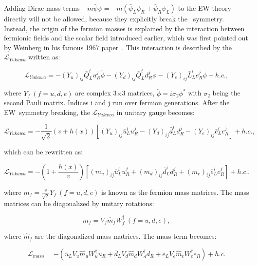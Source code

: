 Adding Dirac mass terms $-m\bar{\psi}\psi=-m(\bar{\psi}_{L}\psi_{R}+\bar{\psi}_{R}\psi_{L})$ to the \ac{EW} theory directly will not be allowed, because they explicitly break the \ew~symmetry. Instead, the origin of the fermion masses is explained by the interaction between fermionic fields and the scalar field introduced earlier, which was first pointed out by Weinberg in his famous 1967 paper~\cite{Weinberg:1967tq}. This interaction is described by the $\mathcal{L}_{Yukawa}$ written as:

\begin{equation}
\label{eq:Yukawa}
\mathcal{L}_{Yukawa}=-(Y_{u})_{ij}\bar{Q}_{L}^{i}u_{R}^{j}\tilde{\phi}-(Y_{d})_{ij}\bar{Q}_{L}^{i}d_{R}^{j}\phi-(Y_{e})_{ij}\bar{L}_{L}^{i}e_{R}^{j}\phi + h.c.,
\end{equation}

where $Y_{f}~(f=u,d,e)$ are complex 3$\times$3 matrices, $\tilde{\phi}=i\sigma_{2}\phi^{*}$ with $\sigma_{2}$ being the second Pauli matrix. Indices i and j run over fermion generations. After the \ac{EW}~symmetry breaking, the $\mathcal{L}_{Yukawa}$ in unitary gauge becomes:

\begin{equation}
\mathcal{L}_{Yukawa}=-\frac{1}{\sqrt{2}}(v+h(x))[(Y_{u})_{ij}\bar{u}_{L}^{i}u_{R}^{j}-(Y_{d})_{ij}\bar{d}_{L}^{i}d_{R}^{j}-(Y_{e})_{ij}\bar{e}_{L}^{i}e_{R}^{j}] + h.c.,
\end{equation}

which can be rewritten as:

\begin{equation}
\mathcal{L}_{Yukawa}=-(1+\frac{h(x)}{v})[(m_{u})_{ij}\bar{u}_{L}^{i}u_{R}^{j}+(m_{d})_{ij}\bar{d}_{L}^{i}d_{R}^{j}+(m_{e})_{ij}\bar{e}_{L}^{i}e_{R}^{j}] + h.c.,
\end{equation}

where $m_f=\frac{v}{\sqrt{2}}Y_{f}~(f=u,d,e)$ is known as the fermion mass matrices. The mass matrices can be diagonalized by unitary rotations:

\begin{equation}
m_{f}=V_{f}\hat{m}_{f}W^{\dagger}_{f}~(f=u,d,e),
\end{equation}

where $\hat{m}_{f}$ are the diagonalized mass matrices. The mass term becomes:

\begin{equation}
\mathcal{L}_{mass}=-(\bar{u}_{L}V_{u}\hat{m}_{u}W_{u}^{\dagger}u_{R}+\bar{d}_{L}V_{d}\hat{m}_{d}W^{\dagger}_{d}d_{R}+\bar{e}_{L}V_{e}\hat{m}_{e}W_{e}^{\dagger}e_{R}) + h.c.
\end{equation}

